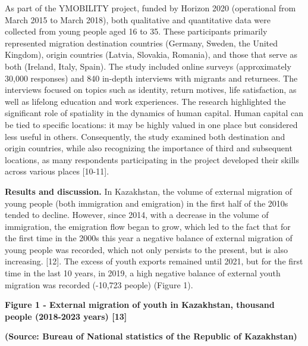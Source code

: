 \begin{multicols}{2}
As part of the YMOBILITY project, funded by Horizon 2020 (operational
from March 2015 to March 2018), both qualitative and quantitative data
were collected from young people aged 16 to 35. These participants
primarily represented migration destination countries (Germany, Sweden,
the United Kingdom), origin countries (Latvia, Slovakia, Romania), and
those that serve as both (Ireland, Italy, Spain). The study included
online surveys (approximately 30,000 responses) and 840 in-depth
interviews with migrants and returnees. The interviews focused on topics
such as identity, return motives, life satisfaction, as well as lifelong
education and work experiences. The research highlighted the significant
role of spatiality in the dynamics of human capital. Human capital can
be tied to specific locations: it may be highly valued in one place but
considered less useful in others. Consequently, the study examined both
destination and origin countries, while also recognizing the importance
of third and subsequent locations, as many respondents participating in
the project developed their skills across various places {[}10-11{]}.

{\bfseries Results and discussion.} In Kazakhstan, the volume of external
migration of young people (both immigration and emigration) in the first
half of the 2010s tended to decline. However, since 2014, with a
decrease in the volume of immigration, the emigration flow began to
grow, which led to the fact that for the first time in the 2000s this
year a negative balance of external migration of young people was
recorded, which not only persists to the present, but is also
increasing. {[}12{]}. The excess of youth exports remained until 2021,
but for the first time in the last 10 years, in 2019, a high negative
balance of external youth migration was recorded (-10,723 people)
(Figure 1).
\end{multicols}

{\bfseries Figure 1 - External migration of youth in Kazakhstan, thousand
people (2018-2023 years) {[}13{]}}

{\bfseries (Source: Bureau of National statistics of the Republic of
Kazakhstan)}

